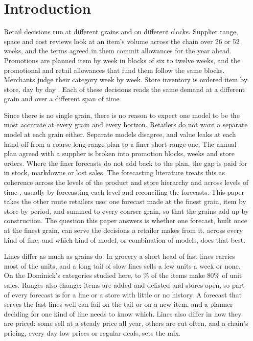 \section{Introduction}
\label{sec:intro}

Retail decisions run at different grains and on different clocks. Supplier
range, space and cost reviews look at an item's volume across the chain over 26
or 52 weeks, and the terms agreed in them commit allowances for the year ahead.
Promotions are planned item by week in blocks of six to twelve weeks, and the
promotional and retail allowances that fund them follow the same blocks.
Merchants judge their category week by week. Store inventory is ordered item by
store, day by day \cite{fildes2022}. Each of these decisions reads the same
demand at a different grain and over a different span of time.

Since there is no single grain, there is no reason to expect one model to be
the most accurate at every grain and every horizon. Retailers do not want a
separate model at each grain either. Separate models disagree, and value leaks
at each hand-off from a coarse long-range plan to a finer short-range one. The
annual plan agreed with a supplier is broken into promotion blocks, weeks and
store orders. Where the finer forecasts do not add back to the plan, the gap is
paid for in stock, markdowns or lost sales. The forecasting literature treats
this as coherence across the levels of the product and store hierarchy
\cite{hyndman2011,mint} and across levels of time \cite{athanasopoulos2017},
usually by forecasting each level and reconciling the forecasts. This paper
takes the other route retailers use: one forecast made at the finest grain,
item by store by period, and summed to every coarser grain, so that the grains
add up by construction. The question this paper answers is whether one
forecast, built once at the finest grain, can serve the decisions a retailer
makes from it, across every kind of line, and which kind of model, or
combination of models, does that best.

Lines differ as much as grains do. In grocery a short head of fast lines
carries most of the units, and a long tail of slow lines sells a few units a
week or none. On the Dominick's categories studied here, \rqFastShareDomLo{}
to \rqFastShareDomHi{}\% of the items make 80\% of unit sales. Ranges also
change: items are added and delisted and stores open, so part of every forecast
is for a line or a store with little or no history. A forecast that serves the
fast lines well can fail on the tail or on a new item, and a planner deciding
for one kind of line needs to know which. Lines also differ in how they are
priced: some sell at a steady price all year, others are cut often, and a
chain's pricing, every day low prices or regular deals, sets the mix.

